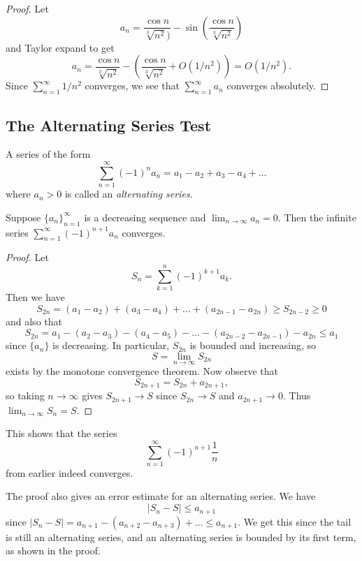\begin{proof}
  Let
  \[
    a_n = 
    \frac{\cos n}{\sqrt[3]{n^2})} - \sin\left(\frac{\cos n}{\sqrt[3]{n^2}}\right)
  \]
  and Taylor expand to get
  \[
    a_n = \frac{\cos n}{\sqrt[3]{n^2}} - \left(\frac{\cos n}{\sqrt[3]{n^2}} + O(1 / n^2)\right)
    = O(1 / n^2).
  \]
  Since $\sum_{n = 1}^\infty 1 / n^2$ converges, we see
  that $\sum_{n = 1}^\infty a_n$ converges absolutely.
\end{proof}

\subsection{The Alternating Series Test}
\begin{definition}
  A series of the form
  \[
    \sum_{n = 1}^\infty (-1)^n a_n
    = a_1 - a_2 + a_3 - a_4 + \dots
  \]
  where $a_n > 0$ is called an \emph{alternating series}.
\end{definition}

\begin{theorem}
  Suppose $\{a_n\}_{n = 1}^\infty$ is a decreasing
  sequence and $\lim_{n \to \infty} a_n = 0$. Then
  the infinite series $\sum_{n = 1}^\infty (-1)^{n + 1} a_n$
  converges.
\end{theorem}

\begin{proof}
  Let
  \[
    S_n = \sum_{k = 1}^n (-1)^{k + 1} a_k.
  \]
  Then we have
  \[
    S_{2n} = (a_1 - a_2) + (a_3 - a_4) + \dots + (a_{2n - 1} - a_{2n})
    \ge S_{2n - 2} \ge 0
  \]
  and also that
  \[
    S_{2n} = a_1 - (a_2 - a_3) - (a_4 - a_5) - \dots - (a_{2n - 2} - a_{2n - 1}) - a_{2n} \le a_1
  \]
  since $\{a_n\}$ is decreasing. In particular,
  $S_{2n}$ is bounded and increasing, so
  \[
    S = \lim_{n \to \infty} S_{2n}
  \]
  exists by the monotone convergence theorem. Now
  observe that
  \[
    S_{2n + 1} = S_{2n} + a_{2n + 1},
  \]
  so taking $n \to \infty$ gives
  $S_{2n + 1} \to S$ since $S_{2n} \to S$ and
  $a_{2n + 1} \to 0$. Thus $\lim_{n \to \infty} S_n = S$.
\end{proof}

\begin{remark}
  This shows that the series
  \[
    \sum_{n = 1}^\infty (-1)^{n + 1} \frac{1}{n}
  \]
  from earlier indeed converges.
\end{remark}

\begin{remark}
  The proof also gives an error estimate for an
  alternating series. We have
  \[
    |S_n - S| \le a_{n + 1}
  \]
  since
  $|S_n - S| = a_{n + 1} - (a_{n + 2} - a_{n + 3}) + \dots
    \le a_{n + 1}$.
  We get this since the tail is still an alternating
  series, and an alternating series is bounded by its
  first term, as shown in the proof.
\end{remark}
